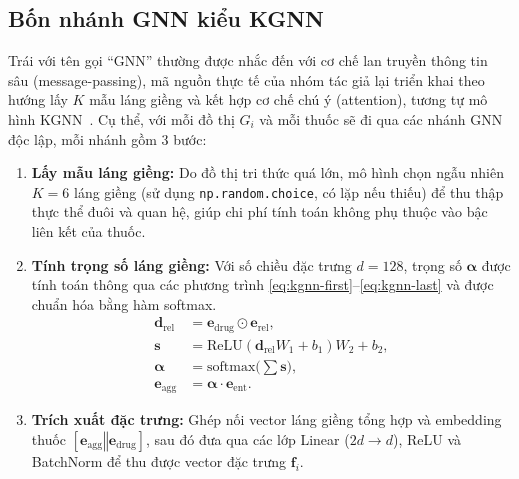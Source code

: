 \documentclass[conference]{IEEEtran}
\renewcommand{\hl}[1]{#1}
\renewcommand{\colorbox}[2]{#2}
\begin{document}
\subsection{Bốn nhánh GNN kiểu KGNN}
\hl{Trái với tên gọi ``GNN'' thường được nhắc đến với cơ chế lan truyền thông tin sâu
(message-passing), mã nguồn thực tế của nhóm tác giả lại triển khai theo hướng lấy}
\colorbox{yellow}{$K$}
\hl{mẫu láng giềng và kết hợp cơ chế chú ý (attention), tương tự mô hình KGNN}\colorbox{yellow}{~\cite{kgnn}}\hl{.
Cụ thể, với mỗi đồ thị}
\colorbox{yellow}{$G_i$}
\hl{và mỗi thuốc sẽ đi qua các nhánh GNN độc lập, mỗi nhánh gồm 3 bước:}
\begin{enumerate}
  \item \textbf{\hl{Lấy mẫu láng giềng:}} \hl{Do đồ thị tri thức quá lớn, mô hình chọn ngẫu nhiên}
  \colorbox{yellow}{$K=6$}
  \hl{láng giềng (sử dụng} \colorbox{yellow}{\texttt{np.random.choice}}\hl{, có lặp nếu thiếu) để thu thập thực thể đuôi và quan hệ,
  giúp chi phí tính toán không phụ thuộc vào bậc liên kết của thuốc.}
  \item \textbf{\hl{Tính trọng số láng giềng:}} \hl{Với số chiều đặc trưng}
  \colorbox{yellow}{$d=128$}\hl{, trọng số}
  \colorbox{yellow}{$\boldsymbol{\alpha}$}
  \hl{được tính toán thông qua các phương trình}
  \colorbox{yellow}{\eqref{eq:kgnn-first}--\eqref{eq:kgnn-last}}
  \hl{và được chuẩn hóa bằng hàm softmax.}
  \begin{align}
    \mathbf{d}_{\text{rel}} &= \mathbf{e}_{\text{drug}} \odot \mathbf{e}_{\text{rel}},\label{eq:kgnn-first}\\
    \mathbf{s} &= \mathrm{ReLU}(\mathbf{d}_{\text{rel}} W_1 + b_1) W_2 + b_2,\\
    \boldsymbol{\alpha} &= \mathrm{softmax}\!\big(\textstyle\sum \mathbf{s}\big),\\
    \mathbf{e}_{\text{agg}} &= \boldsymbol{\alpha} \cdot \mathbf{e}_{\text{ent}}.\label{eq:kgnn-last}
  \end{align}
  \item \textbf{\hl{Trích xuất đặc trưng:}} \hl{Ghép nối vector láng giềng tổng hợp và embedding thuốc}
  \colorbox{yellow}{$[\mathbf{e}_{\text{agg}} \mathbin{\Vert} \mathbf{e}_{\text{drug}}]$}\hl{, sau đó đưa qua các lớp Linear}
  \colorbox{yellow}{($2d \to d$)}\hl{, ReLU và BatchNorm để thu được vector đặc trưng}
  \colorbox{yellow}{$\mathbf{f}_i$}\hl{.}
\end{enumerate}
\end{document}
